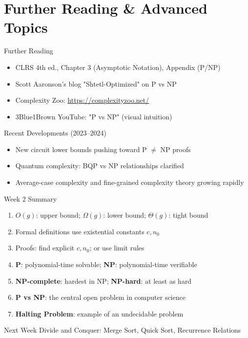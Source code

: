 \documentclass[aspectratio=169,xcolor=dvipsnames]{beamer}
\begin{document}
\section{Further Reading \& Advanced Topics}
\begin{frame}{Further Reading}
  \begin{itemize}
    \item CLRS 4th ed., Chapter 3 (Asymptotic Notation), Appendix (P/NP)
    \item Scott Aaronson's blog "Shtetl-Optimized" on P vs NP
    \item Complexity Zoo: \url{https://complexityzoo.net/}
    \item 3Blue1Brown YouTube: "P vs NP" (visual intuition)
  \end{itemize}
  \begin{exampleblock}{Recent Developments (2023--2024)}
    \begin{itemize}
      \item New circuit lower bounds pushing toward P $\ne$ NP proofs
      \item Quantum complexity: BQP vs NP relationships clarified
      \item Average-case complexity and fine-grained complexity theory growing rapidly
    \end{itemize}
  \end{exampleblock}
\end{frame}

\begin{frame}{Week 2 Summary}
  \begin{enumerate}
    \item $O(g)$: upper bound; $\Omega(g)$: lower bound; $\Theta(g)$: tight bound
    \item Formal definitions use existential constants $c, n_0$
    \item Proofs: find explicit $c, n_0$; or use limit rules
    \item \textbf{P}: polynomial-time solvable; \textbf{NP}: polynomial-time verifiable
    \item \textbf{NP-complete}: hardest in NP; \textbf{NP-hard}: at least as hard
    \item \textbf{P vs NP}: the central open problem in computer science
    \item \textbf{Halting Problem}: example of an undecidable problem
  \end{enumerate}
  \begin{block}{Next Week}
    Divide and Conquer: Merge Sort, Quick Sort, Recurrence Relations
  \end{block}
\end{frame}
\end{document}
